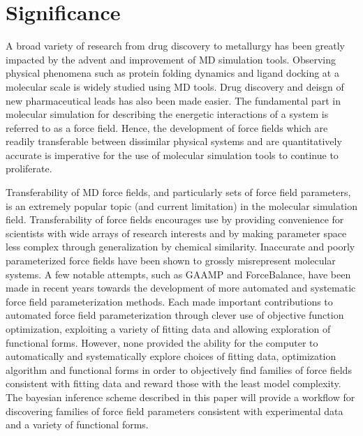 \documentclass[rmp,nofootinbib,superscriptaddress,12pt,tightenlines,notitlepage]{revtex4-1}
\begin{document}
\section{Significance}
A broad variety of research from drug discovery to metallurgy has been greatly impacted by the advent and improvement of MD simulation tools. Observing physical phenomena such as protein folding dynamics and ligand docking at a molecular scale is widely studied using MD tools.\cite{villin} Drug discovery and deisgn of new pharmaceutical leads has also been made easier.\cite{drug_discov} The fundamental part in molecular simulation for describing the energetic interactions of a system is referred to as a force field. Hence, the development of force fields which are readily transferable between dissimilar physical systems and are quantitatively accurate is imperative for the use of molecular simulation tools to continue to proliferate.

Transferability of MD force fields, and particularly sets of force field parameters, is an extremely popular topic (and current limitation) in the molecular simulation field.\cite{transferability1,transferability2,transferability3,transferability4} Transferability of force fields encourages use by providing convenience for scientists with wide arrays of research interests and by making parameter space less complex through generalization by chemical similarity. Inaccurate and poorly parameterized force fields have been shown to grossly misrepresent molecular systems.\cite{ffcomp1,ffcomp2} A few notable attempts, such as GAAMP and ForceBalance, have been made in recent years towards the development of more automated and systematic force field parameterization methods.\cite{GAAMP,FB1,FB2,FB3} Each made important contributions to automated force field parameterization through clever use of objective function optimization, exploiting a variety of fitting data and allowing exploration of functional forms. However, none provided the ability for the computer to automatically and systematically explore choices of fitting data, optimization algorithm and functional forms in order to objectively find families of force fields consistent with fitting data and reward those with the least model complexity. The bayesian inference scheme described in this paper will provide a workflow for discovering families of force field parameters consistent with experimental data and a variety of functional forms.
\end{document}
